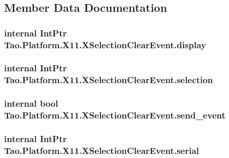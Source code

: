 \subsection{Member Data Documentation}
\hypertarget{struct_tao_1_1_platform_1_1_x11_1_1_x_selection_clear_event_a12d8a509a9eb87f38c8e280cd0274f78}{
\subsubsection[{display}]{\setlength{\rightskip}{0pt plus 5cm}internal IntPtr {\bf Tao.Platform.X11.XSelectionClearEvent.display}}}
\label{struct_tao_1_1_platform_1_1_x11_1_1_x_selection_clear_event_a12d8a509a9eb87f38c8e280cd0274f78}
\hypertarget{struct_tao_1_1_platform_1_1_x11_1_1_x_selection_clear_event_aac480a8449bc8731a019ee759e9e9da5}{
\subsubsection[{selection}]{\setlength{\rightskip}{0pt plus 5cm}internal IntPtr {\bf Tao.Platform.X11.XSelectionClearEvent.selection}}}
\label{struct_tao_1_1_platform_1_1_x11_1_1_x_selection_clear_event_aac480a8449bc8731a019ee759e9e9da5}
\hypertarget{struct_tao_1_1_platform_1_1_x11_1_1_x_selection_clear_event_a96d037023fe0093f4c8e789ed8436dd8}{
\subsubsection[{send\_\-event}]{\setlength{\rightskip}{0pt plus 5cm}internal bool {\bf Tao.Platform.X11.XSelectionClearEvent.send\_\-event}}}
\label{struct_tao_1_1_platform_1_1_x11_1_1_x_selection_clear_event_a96d037023fe0093f4c8e789ed8436dd8}
\hypertarget{struct_tao_1_1_platform_1_1_x11_1_1_x_selection_clear_event_a7a94502562ab689728d12ceabce7e934}{
\subsubsection[{serial}]{\setlength{\rightskip}{0pt plus 5cm}internal IntPtr {\bf Tao.Platform.X11.XSelectionClearEvent.serial}}}
